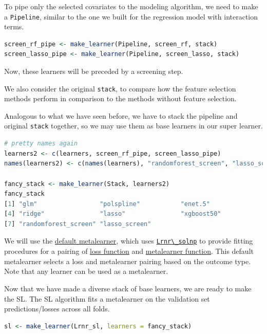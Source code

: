 \documentclass[
  12pt, krantz2,
]{krantz}
\newcommand{\passthrough}[1]{#1}
\newcommand{\1}{\mathbbm{1}}
\theoremstyle{definition}
\theoremstyle{definition}
\theoremstyle{definition}
\theoremstyle{definition}
\theoremstyle{remark}
\begin{document}
To pipe only the selected covariates to the modeling algorithm, we need to
make a \passthrough{\lstinline!Pipeline!}, similar to the one we built for the regression model with
interaction terms.

\begin{lstlisting}[language=R]
screen_rf_pipe <- make_learner(Pipeline, screen_rf, stack)
screen_lasso_pipe <- make_learner(Pipeline, screen_lasso, stack)
\end{lstlisting}

Now, these learners will be preceded by a screening step.

We also consider the original \passthrough{\lstinline!stack!}, to compare how the feature selection
methods perform in comparison to the methods without feature selection.

Analogous to what we have seen before, we have to stack the pipeline and
original \passthrough{\lstinline!stack!} together, so we may use them as base learners in our super
learner.

\begin{lstlisting}[language=R]
# pretty names again
learners2 <- c(learners, screen_rf_pipe, screen_lasso_pipe)
names(learners2) <- c(names(learners), "randomforest_screen", "lasso_screen")

fancy_stack <- make_learner(Stack, learners2)
fancy_stack
[1] "glm"                 "polspline"           "enet.5"             
[4] "ridge"               "lasso"               "xgboost50"          
[7] "randomforest_screen" "lasso_screen"       
\end{lstlisting}

We will use the \href{https://tlverse.org/sl3/reference/default_metalearner.html}{default
metalearner},
which uses
\href{https://tlverse.org/sl3/reference/Lrnr_solnp.html}{\passthrough{\lstinline!Lrnr\_solnp!}} to
provide fitting procedures for a pairing of \href{https://tlverse.org/sl3/reference/loss_functions.html}{loss
function} and
\href{https://tlverse.org/sl3/reference/metalearners.html}{metalearner
function}. This
default metalearner selects a loss and metalearner pairing based on the outcome
type. Note that any learner can be used as a metalearner.

Now that we have made a diverse stack of base learners, we are ready to make the
SL. The SL algorithm fits a metalearner on the validation set
predictions/losses across all folds.

\begin{lstlisting}[language=R]
sl <- make_learner(Lrnr_sl, learners = fancy_stack)
\end{lstlisting}
\end{document}
